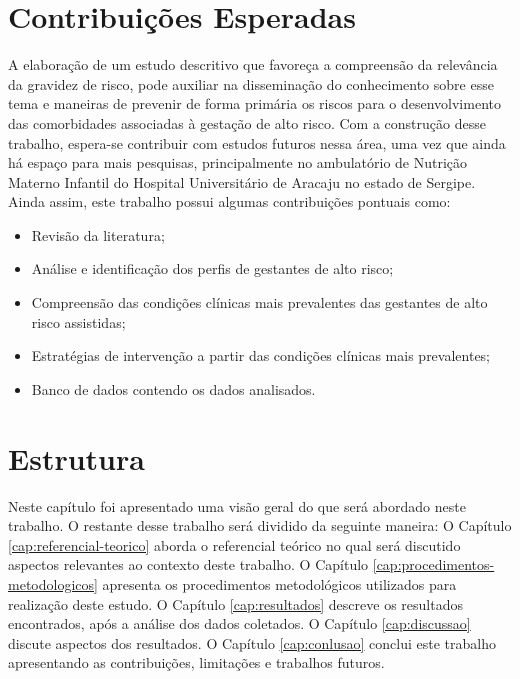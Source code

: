 \section{Contribuições Esperadas}\label{sec:intro:contribuicoes-esperadas}
A elaboração de um estudo descritivo que favoreça a compreensão da relevância da gravidez de risco, pode auxiliar na disseminação do conhecimento sobre esse tema e maneiras de prevenir de forma primária os riscos para o desenvolvimento das comorbidades associadas à gestação de alto risco. Com a construção desse trabalho, espera-se contribuir com estudos futuros nessa área, uma vez que ainda há espaço para mais pesquisas, principalmente no ambulatório de Nutrição Materno Infantil do Hospital Universitário de Aracaju no estado de Sergipe. Ainda assim, este trabalho possui algumas contribuições pontuais como:
\begin{itemize}
 \item{Revisão da literatura;}
 \item{Análise e identificação dos perfis de gestantes de alto risco;}
  \item{Compreensão das condições clínicas mais prevalentes das gestantes de alto risco assistidas;}
  \item{Estratégias de intervenção a partir das condições clínicas mais prevalentes;}
 \item{Banco de dados contendo os dados analisados.}
\end{itemize}

\section{Estrutura}

Neste capítulo foi apresentado uma visão geral do que será abordado neste trabalho. O restante desse trabalho será dividido da seguinte maneira: O Capítulo \ref{cap:referencial-teorico} aborda o referencial teórico no qual será discutido aspectos relevantes ao contexto deste trabalho. O Capítulo \ref{cap:procedimentos-metodologicos} apresenta os procedimentos metodológicos utilizados para realização deste estudo. O Capítulo \ref{cap:resultados} descreve os resultados encontrados, após a análise dos dados coletados. O Capítulo \ref{cap:discussao} discute aspectos dos resultados. O Capítulo \ref{cap:conlusao} conclui este trabalho apresentando as contribuições, limitações e trabalhos futuros.
